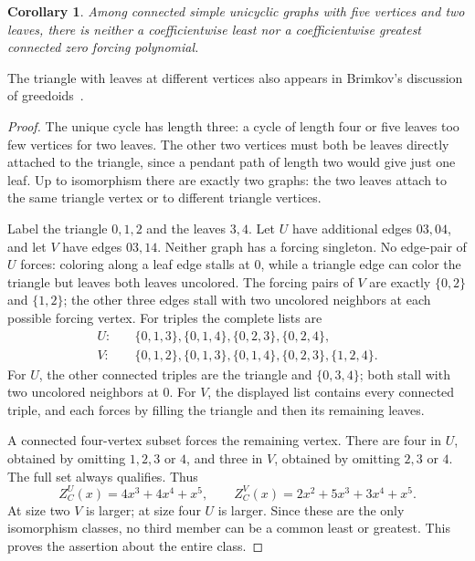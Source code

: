 \documentclass[11pt]{article}
\newtheorem{corollary}[theorem]{Corollary}
\newcommand{\ZC}{Z_C}
\begin{document}
\begin{corollary}\label{cor:unicyclic}
Among connected simple unicyclic graphs with five vertices and two leaves,
there is neither a coefficientwise least nor a coefficientwise greatest
connected zero forcing polynomial.
\end{corollary}
The triangle with leaves at different vertices also appears in
Brimkov's discussion of greedoids~\cite[Section 7.2, pp.~159--160]{B}.
\begin{proof}
The unique cycle has length three: a cycle of length four or five leaves
too few vertices for two leaves. The other two vertices must both be
leaves directly attached to the triangle, since a pendant path of length
two would give just one leaf. Up to isomorphism there are exactly two
graphs: the two leaves attach to the same triangle vertex or to different
triangle vertices.

Label the triangle $0,1,2$ and the leaves $3,4$.
Let $U$ have additional edges $03,04$, and let $V$ have edges $03,14$.
Neither graph has a forcing singleton. No edge-pair of $U$ forces:
coloring along a leaf edge stalls at $0$, while a triangle edge can
color the triangle but leaves both leaves uncolored. The forcing pairs
of $V$ are exactly $\{0,2\}$ and $\{1,2\}$; the other three edges
stall with two uncolored neighbors at each possible forcing vertex.
For triples the complete lists are
\begin{align*}
U:&\quad \{0,1,3\},\{0,1,4\},\{0,2,3\},\{0,2,4\},\\
V:&\quad \{0,1,2\},\{0,1,3\},\{0,1,4\},\{0,2,3\},\{1,2,4\}.
\end{align*}
For $U$, the other connected triples are the triangle and $\{0,3,4\}$;
both stall with two uncolored neighbors at $0$. For $V$, the displayed
list contains every connected triple, and each forces by filling the
triangle and then its remaining leaves.

A connected four-vertex subset forces the remaining vertex. There are
four in $U$, obtained by omitting $1,2,3$ or $4$, and three in $V$,
obtained by omitting $2,3$ or $4$. The full set always qualifies. Thus
\[
\ZC^U(x)=4x^3+4x^4+x^5,\qquad
\ZC^V(x)=2x^2+5x^3+3x^4+x^5.
\]
At size two $V$ is larger; at size four $U$ is larger. Since these are
the only isomorphism classes, no third member can be a common least
or greatest. This proves the assertion about the entire class.
\end{proof}
\end{document}

